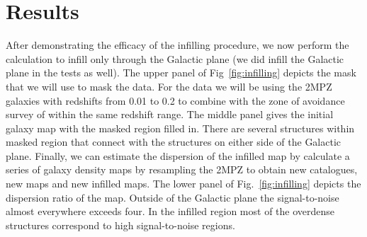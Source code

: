 \documentclass[useAMS,usenatbib]{mn2e}
\begin{document}
\section{Results}

After demonstrating the efficacy of the infilling procedure, we now
perform the calculation to infill only through the Galactic plane (we
did infill the Galactic plane in the tests as well).  The upper panel
of Fig~\ref{fig:infilling} depicts the mask that we will use to mask
the data.  For the data we will be using the 2MPZ galaxies with redshifts from 0.01 to 0.2 to combine with the zone of avoidance survey of \citet{2016AJ....151...52S} within the same redshift range. The middle
panel gives the initial galaxy map with the masked region filled in.
There are several structures within masked region that connect with
the structures on either side of the Galactic plane.  Finally, we can
estimate the dispersion of the infilled map by calculate a series
of galaxy density maps by resampling the 2MPZ to obtain new
catalogues, new maps and new infilled maps.  The lower panel of
Fig.~\ref{fig:infilling} depicts the dispersion ratio of the map.
Outside of the Galactic plane the signal-to-noise almost everywhere
exceeds four.  In the infilled region most of the overdense structures
correspond to high signal-to-noise regions.
\end{document}
